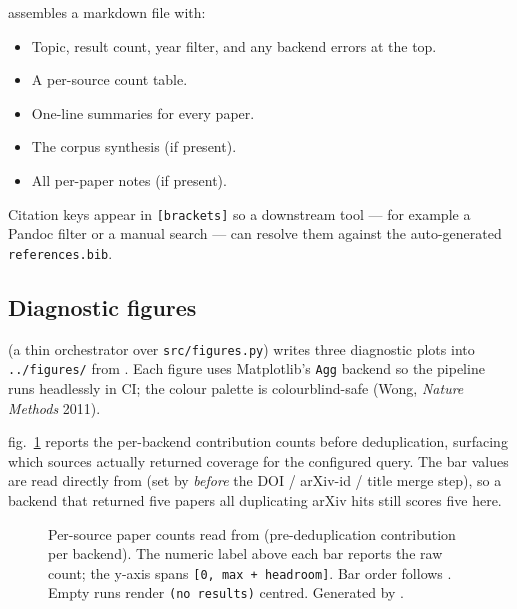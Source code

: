 \documentclass[
  english,
]{article}
\makeatletter
\newcommand*\pandocbounded[1]{%
  \sbox\pandoc@box{#1}%
  \Gscale@div\@tempa{\textheight}{\dimexpr\ht\pandoc@box+\dp\pandoc@box\relax}%
  \Gscale@div\@tempb{\linewidth}{\wd\pandoc@box}%
  \ifdim\@tempb\p@<\@tempa\p@\let\@tempa\@tempb\fi%
  \ifdim\@tempa\p@<\p@\scalebox{\@tempa}{\usebox\pandoc@box}%
  \else\usebox{\pandoc@box}%
  \fi%
}
\providecommand{\tightlist}{%
  \setlength{\itemsep}{0pt}\setlength{\parskip}{0pt}}
\makeatother
\begin{document}
 assembles a markdown file
with:

\begin{itemize}
\tightlist
\item
  Topic, result count, year filter, and any backend errors at the top.
\item
  A per-source count table.
\item
  One-line summaries for every paper.
\item
  The corpus synthesis (if present).
\item
  All per-paper notes (if present).
\end{itemize}

Citation keys appear in \texttt{{[}brackets{]}} so a downstream tool ---
for example a Pandoc filter or a manual search --- can resolve them
against the auto-generated \texttt{references.bib}.

\subsection{Diagnostic figures}\label{diagnostic-figures}

 (a thin orchestrator
over \texttt{src/figures.py}) writes three diagnostic plots into
\texttt{../figures/} from . Each
figure uses Matplotlib's \texttt{Agg} backend so the pipeline runs
headlessly in CI; the colour palette is colourblind-safe (Wong,
\emph{Nature Methods} 2011).

fig.~\ref{fig:papers_per_source} reports the per-backend contribution
counts before deduplication, surfacing which sources actually returned
coverage for the configured query. The bar values are read directly from
 (set by
 \emph{before} the DOI / arXiv-id / title merge
step), so a backend that returned five papers all duplicating arXiv hits
still scores five here.

\begin{figure}
\centering
\pandocbounded{\includegraphics[keepaspectratio,alt={Per-source paper counts read from SearchResult.per\_source\_counts (pre-deduplication contribution per backend). The numeric label above each bar reports the raw count; the y-axis spans {[}0, max + headroom{]}. Bar order follows project\_config.search.sources. Empty runs render (no results) centred. Generated by src/figures.py::plot\_papers\_per\_source.}]{../figures/papers_per_source.png}}
\caption{Per-source paper counts read from
\protect{} (pre-deduplication
contribution per backend). The numeric label above each bar reports the
raw count; the y-axis spans \protect\texttt{{[}0,\ max\ +\ headroom{]}}.
Bar order follows \protect{}. Empty
runs render \protect\texttt{(no\ results)} centred. Generated by
\protect{}.}\label{fig:papers_per_source}
\end{figure}
\end{document}
